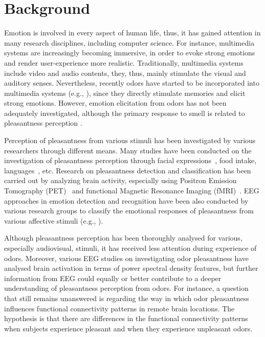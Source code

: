 \section{Background}


Emotion is involved in every aspect of human life, thus, it has gained attention in many research disciplines, including computer science. For instance, multimedia systems are increasingly becoming immersive, in order to evoke strong emotions and render user-experience more realistic. Traditionally, multimedia systems include video and audio contents, they, thus, mainly stimulate the visual and auditory senses. Nevertheless, recently odors have started to be incorporated into multimedia systems (e.g., \cite{nakamoto2011olfactory,nakamoto2008cooking,richard2006multi}), since they directly stimulate memories and elicit strong emotions. However, emotion elicitation from odors has not been adequately investigated, although the primary response to smell is related to pleasantness perception \cite{gulas1995right}. 

Perception of pleasantness from various stimuli has been investigated by various researchers through different means. Many studies have been conducted on the investigation of pleasantness perception through facial expressions~\cite{lyons1998coding}, food intake\cite{de2003taste}, languages~\cite{bellezza1986words}, etc. Research on pleasantness detection and classification has been carried out by analyzing brain activity, especially using Positron Emission Tomography (PET)~\cite{zatorre2000neural} and functional Magnetic Resonance Imaging (fMRI)~\cite{kringelbach2003activation}. EEG approaches in emotion detection and recognition have been also conducted by various research groups to classify the emotional responses of pleasantness from various affective stimuli (e.g., ).

Although pleasantness perception has been thoroughly analysed for various, especially audiovisual, stimuli, it has received less attention during experience of odors. Moreover, various EEG studies on investigating odor pleasantness have analysed brain activation in terms of power spectral density features, but further information from EEG could equally or better contribute to a deeper understanding of pleasantness perception from odors. For instance, a question that still remains unanswered is regarding the way in which odor pleasantness influences functional connectivity patterns in remote brain locations. The hypothesis is that there are differences in the functional connectivity patterns when subjects experience pleasant and when they experience unpleasant odors. 

